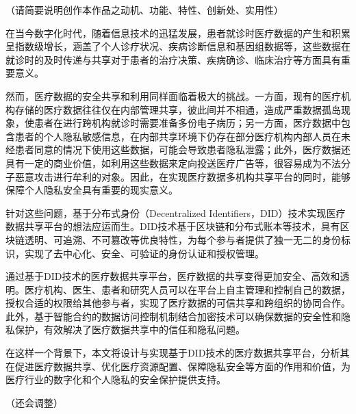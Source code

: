 \documentclass{cumcmthesis}
\numberwithin{equation}{section} %
\numberwithin{figure}{section} %
\numberwithin{table}{section} %
\begin{document}
	
\normalem

\maketitle
 
\newpage
\thispagestyle{empty}
\tableofcontents
\newpage
 
%

\setcounter{page}{1}
 
\begin{cnabstract}
	
（请简要说明创作本作品之动机、功能、特性、创新处、实用性）

在当今数字化时代，随着信息技术的迅猛发展，患者就诊时医疗数据的产生和积累呈指数级增长，涵盖了个人诊疗状况、疾病诊断信息和基因组数据等，这些数据在就诊时的及时传递与共享对于患者的治疗决策、疾病确诊、临床治疗等方面具有重要意义。

然而，医疗数据的安全共享和利用同样面临着极大的挑战。一方面，现有的医疗机构存储的医疗数据往往仅在内部管理共享，彼此间并不相通，造成严重数据孤岛现象，使患者在进行跨机构就诊时需要准备多份电子病历；另一方面，医疗数据中包含患者的个人隐私敏感信息，在内部共享环境下仍存在部分医疗机构内部人员在未经患者同意的情况下使用这些数据，可能会导致患者隐私泄露；此外，医疗数据还具有一定的商业价值，如利用这些数据来定向投送医疗广告等，很容易成为不法分子恶意攻击进行牟利的对象。因此，在实现医疗数据多机构共享平台的同时，能够保障个人隐私安全具有重要的现实意义。

针对这些问题，基于分布式身份（Decentralized Identifiers，DID）技术实现医疗数据共享平台的想法应运而生。DID技术基于区块链和分布式账本等技术，具有区块链透明、可追溯、不可篡改等优良特性，为每个参与者提供了独一无二的身份标识，实现了去中心化、安全、可验证的身份认证和授权管理。

通过基于DID技术的医疗数据共享平台，医疗数据的共享变得更加安全、高效和透明。医疗机构、医生、患者和研究人员可以在平台上自主管理和控制自己的数据，授权合适的权限给其他参与者，实现了医疗数据的可信共享和跨组织的协同合作。此外，基于智能合约的数据访问控制机制结合加密技术可以确保数据的安全性和隐私保护，有效解决了医疗数据共享中的信任和隐私问题。

在这样一个背景下，本文将设计与实现基于DID技术的医疗数据共享平台，分析其在促进医疗数据共享、优化医疗资源配置、保障隐私安全等方面的作用和价值，为医疗行业的数字化和个人隐私的安全保护提供支持。

（还会调整）
	
\end{cnabstract}
\end{document}
